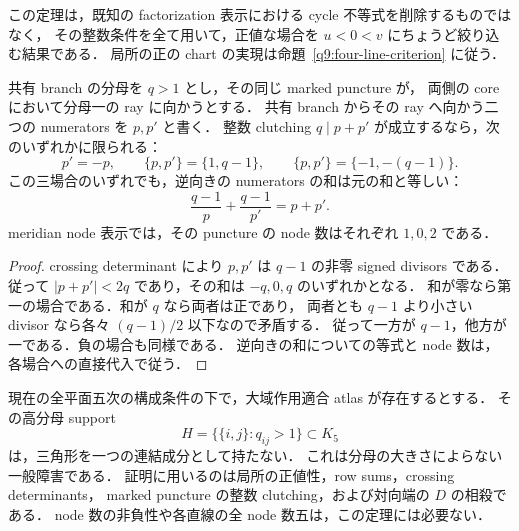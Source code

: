 この定理は，既知の factorization 表示における cycle 不等式を削除するものではなく，
その整数条件を全て用いて，正値な場合を $u<0<v$ にちょうど絞り込む結果である．
局所の正の chart の実現は命題~\ref{q9:four-line-criterion} に従う．

\begin{lemma}\label{ls11:low-puncture}
共有 branch の分母を $q>1$ とし，その同じ marked puncture が，
両側の core において分母一の ray に向かうとする．
共有 branch からその ray へ向かう二つの numerators を $p,p'$ と書く．
整数 clutching $q\mid p+p'$ が成立するなら，次のいずれかに限られる：
\[
 p'=-p,\qquad
 \{p,p'\}=\{1,q-1\},\qquad
 \{p,p'\}=\{-1,-(q-1)\}.
\]
この三場合のいずれでも，逆向きの numerators の和は元の和と等しい：
\[
 \frac{q-1}{p}+\frac{q-1}{p'}=p+p'.
\]
meridian node 表示では，その puncture の node 数はそれぞれ $1,0,2$ である．
\end{lemma}

\begin{proof}
crossing determinant により $p,p'$ は $q-1$ の非零 signed divisors である．
従って $|p+p'|<2q$ であり，その和は $-q,0,q$ のいずれかとなる．
和が零なら第一の場合である．和が $q$ なら両者は正であり，
両者とも $q-1$ より小さい divisor なら各々 $(q-1)/2$ 以下なので矛盾する．
従って一方が $q-1$，他方が一である．負の場合も同様である．
逆向きの和についての等式と node 数は，各場合への直接代入で従う．
\end{proof}

\begin{theorem}[高分母の三角形成分の不存在]\label{ls11:no-triangle-component}
現在の全平面五次の構成条件の下で，大域作用適合 atlas が存在するとする．
その高分母 support
\[
 H=\bigl\{\{i,j\}:q_{ij}>1\bigr\}\subset K_5
\]
は，三角形を一つの連結成分として持たない．
これは分母の大きさによらない一般障害である．
証明に用いるのは局所の正値性，row sums，crossing determinants，
marked puncture の整数 clutching，および対向端の $D$ の相殺である．
node 数の非負性や各直線の全 node 数五は，この定理には必要ない．
\end{theorem}

